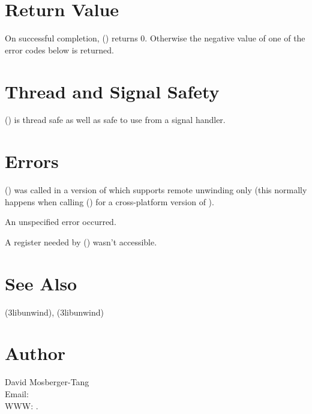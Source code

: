\documentclass{article}
\begin{document}
\section{Return Value}

On successful completion, () returns 0.
Otherwise the negative value of one of the error codes below is
returned.

\section{Thread and Signal Safety}

() is thread safe as well as safe to use from a
signal handler.

\section{Errors}

\begin{Description}
\item[\Const{UNW\_EINVAL}] () was called in a
  version of  which supports remote unwinding only
  (this normally happens when calling () for a
  cross-platform version of ).
\item[\Const{UNW\_EUNSPEC}] An unspecified error occurred.
\item[\Const{UNW\_EBADREG}] A register needed by ()
  wasn't accessible.
\end{Description}

\section{See Also}

(3libunwind),
(3libunwind)

\section{Author}

\noindent
David Mosberger-Tang\\
Email: \\
WWW: .
\LatexManEnd
\end{document}

